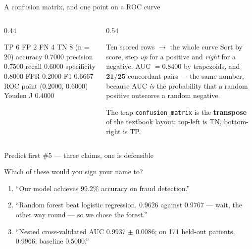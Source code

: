 \documentclass[aspectratio=169]{beamer}
\begin{document}
\begin{frame}[fragile,shrink=6]{A confusion matrix, and one point on a ROC curve}
  \begin{columns}[T]
    \begin{column}{0.44\textwidth}
\begin{outblk}
TP 6  FP 2  FN 4  TN 8   (n = 20)
accuracy    0.7000
precision   0.7500
recall      0.6000
specificity 0.8000
FPR         0.2000
F1          0.6667
ROC point   (0.2000, 0.6000)
Youden J    0.4000
\end{outblk}
    \end{column}
    \begin{column}{0.54\textwidth}
      \begin{block}{Ten scored rows $\to$ the whole curve}
        Sort by score, step \emph{up} for a positive and \emph{right} for a
        negative. AUC $= \mathbf{0.8400}$ by trapezoids, and
        $\mathbf{21/25}$ concordant pairs --- the same number, because AUC
        \emph{is} the probability that a random positive outscores a random
        negative.
      \end{block}
      \begin{alertblock}{The trap}
        \texttt{confusion\_matrix} is the \textbf{transpose} of the textbook
        layout: top-left is TN, bottom-right is TP.
      \end{alertblock}
    \end{column}
  \end{columns}
\end{frame}

\begin{frame}[shrink=6]{Predict first \#5 --- three claims, one is defensible}
  \begin{block}{Which of these would you sign your name to?}
    \begin{enumerate}
      \item ``Our model achieves 99.2\% accuracy on fraud detection.''
      \item ``Random forest beat logistic regression, 0.9626 against 0.9767
        --- wait, the other way round --- so we chose the forest.''
      \item ``Nested cross-validated AUC 0.9937 $\pm$ 0.0086; on 171 held-out
        patients, 0.9966; baseline 0.5000.''
    \end{enumerate}
  \end{block}
\end{frame}
\end{document}
